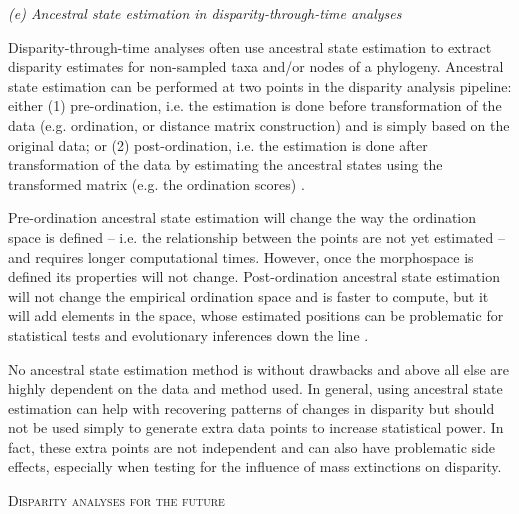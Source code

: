 \documentclass[12pt,letterpaper]{article}
\renewcommand{\section}[1]{%
\bigskip
\begin{center}
\begin{Large}
\normalfont\scshape #1
\medskip
\end{Large}
\end{center}}
\renewcommand{\subsection}[1]{%
\bigskip
\begin{center}
\begin{large}
\normalfont\itshape #1
\end{large}
\end{center}}
\begin{document}
\subsection{(e) Ancestral state estimation in disparity-through-time analyses}

Disparity-through-time analyses often use ancestral state estimation to extract disparity estimates for non-sampled taxa and/or nodes of a phylogeny.
Ancestral state estimation can be performed at two points in the disparity analysis pipeline: either (1) pre-ordination, i.e. the estimation is done before transformation of the data (e.g. ordination, or distance matrix construction) and is simply based on the original data; or (2) post-ordination, i.e. the estimation is done after transformation of the data by estimating the ancestral states using the transformed matrix (e.g. the ordination scores) \citep{lloyd2018}.

Pre-ordination ancestral state estimation will change the way the ordination space is defined -- i.e. the relationship between the points are not yet estimated -- and requires longer computational times.
However, once the morphospace is defined its properties will not change.
Post-ordination ancestral state estimation will not change the empirical ordination space and is faster to compute, but it will add elements in the space, whose estimated positions can be problematic for statistical tests and evolutionary inferences down the line \citep{lloyd2018}.

No ancestral state estimation method is without drawbacks
 and above all else are highly dependent on the data and method used.
In general, using ancestral state estimation can help with recovering patterns of changes in disparity but should not be used simply to generate extra data points to increase statistical power.
In fact, these extra points are not independent and can also have problematic side effects, especially when testing for the influence of mass extinctions on disparity.

\section{Disparity analyses for the future}
\end{document}

